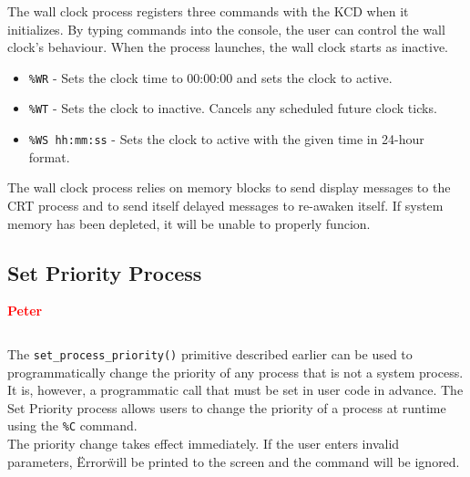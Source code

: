 \documentclass[12pt]{report}
\begin{document}
The wall clock process registers three commands with the KCD when it initializes. By typing commands into the console, the user can control the wall clock's behaviour. When the process launches, the wall clock starts as inactive.\\

\begin{itemize}

\item {\tt \%WR} - Sets the clock time to 00:00:00 and sets the clock to active.\\
\item {\tt \%WT} - Sets the clock to inactive. Cancels any scheduled future clock ticks.\\
\item {\tt \%WS hh:mm:ss} - Sets the clock to active with the given time in 24-hour format.\\

\end{itemize}

The wall clock process relies on memory blocks to send display messages to the CRT process and to send itself delayed messages to re-awaken itself. If system memory has been depleted, it will be unable to properly funcion.\\

\subsection{Set Priority Process}

\textcolor{red}{\textbf{Peter}} \\

\begin{minipage}{\textwidth}
\begin{lstlisting}[language=C, frame=single]
%C process_id new_priority
\end{lstlisting}
\end{minipage}

The {\tt set\_process\_priority()} primitive described earlier can be used to programmatically change the priority of any process that is not a system process. It is, however, a programmatic call that must be set in user code in advance. The Set Priority process allows users to change the priority of a process at runtime using the {\tt \%C} command.\\

The priority change takes effect immediately. If the user enters invalid parameters, \"Error\" will be printed to the screen and the command will be ignored.\\
\end{document}
